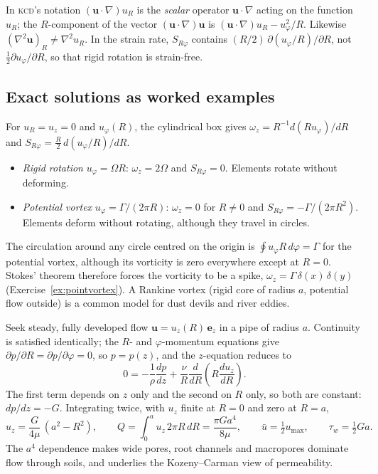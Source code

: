 \documentclass[11pt,letterpaper]{article}
\numberwithin{equation}{section}
\newcommand{\uu}{\mathbf{u}}
\newcommand{\e}[1]{\mathbf{e}_{#1}}
\newcommand{\od}[2]{\frac{d #1}{d #2}}
\newcommand{\Kundu}{\textnormal{\textsc{kcd}}}   %
\begin{document}
\begin{pitfall}
In \Kundu's notation $(\uu\cdot\nabla)u_R$ is the \emph{scalar} operator $\uu\cdot\nabla$ acting on the function $u_R$; the
$R$-component of the vector $(\uu\cdot\nabla)\uu$ is $(\uu\cdot\nabla)u_R-u_\varphi^2/R$. Likewise $(\nabla^2\uu)_R\neq\nabla^2u_R$. In the
strain rate, $S_{R\varphi}$ contains $(R/2)\,\partial(u_\varphi/R)/\partial R$, not $\tfrac12\partial u_\varphi/\partial R$, so that rigid rotation
is strain-free.
\end{pitfall}

\subsection{Exact solutions as worked examples}
\begin{worked}\label{we:vortices}
For $u_R=u_z=0$ and $u_\varphi(R)$, the cylindrical box gives $\omega_z=R^{-1}d(Ru_\varphi)/dR$ and $S_{R\varphi}=\tfrac R2\,d(u_\varphi/R)/dR$.
\begin{itemize}[leftmargin=1.2em]
  \item \emph{Rigid rotation} $u_\varphi=\Omega R$: $\omega_z=2\Omega$ and $S_{R\varphi}=0$. Elements rotate without deforming.
  \item \emph{Potential vortex} $u_\varphi=\Gamma/(2\pi R)$: $\omega_z=0$ for $R\neq0$ and $S_{R\varphi}=-\Gamma/(2\pi R^2)$. Elements deform
        without rotating, although they travel in circles.
\end{itemize}
The circulation around any circle centred on the origin is $\oint u_\varphi R\,d\varphi=\Gamma$ for the potential vortex, although its
vorticity is zero everywhere except at $R=0$. Stokes' theorem therefore forces the vorticity to be a spike,
$\omega_z=\Gamma\,\delta(x)\,\delta(y)$ (Exercise~\ref{ex:pointvortex}). A Rankine vortex (rigid core of radius $a$, potential flow outside)
is a common model for dust devils and river eddies.
\end{worked}

\begin{worked}\label{we:poiseuille}
Seek steady, fully developed flow $\uu=u_z(R)\,\e{z}$ in a pipe of radius $a$. Continuity is satisfied identically; the $R$- and
$\varphi$-momentum equations give $\partial p/\partial R=\partial p/\partial\varphi=0$, so $p=p(z)$, and the $z$-equation reduces to
\[
0=-\frac{1}{\rho}\od{p}{z}+\frac{\nu}{R}\od{}{R}\!\left(R\od{u_z}{R}\right).
\]
The first term depends on $z$ only and the second on $R$ only, so both are constant: $dp/dz=-G$. Integrating twice, with $u_z$
finite at $R=0$ and zero at $R=a$,
\begin{equation}\label{eq:poiseuille}
u_z=\frac{G}{4\mu}\,(a^2-R^2),\qquad Q=\int_0^a u_z\,2\pi R\,dR=\frac{\pi Ga^4}{8\mu},\qquad \bar u=\tfrac12u_{\max},\qquad \tau_w=\tfrac12Ga.
\end{equation}
The $a^4$ dependence makes wide pores, root channels and macropores dominate flow through soils, and underlies the Kozeny--Carman
view of permeability.
\end{worked}
\end{document}
